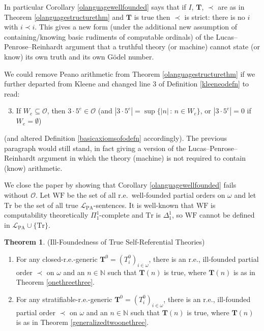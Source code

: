 \documentclass[reqno]{article}
\theoremstyle{definition}
\newtheorem{theorem}{Theorem}
\def\N{\mathbb{N}}
\def\L{\mathscr{L}}
\def\T{\mathbf{T}}
\def\O{\mathcal{O}}
\def\LPA{\L_{\mathrm{PA}}}
\def\Tr{\mathrm{Tr}}
\begin{document}
In particular
Corollary \ref{olanguagewellfounded} says that
if $I$, $\T$, $\prec$ are as in Theorem \ref{olanguagestructurethm} and $\T$ is true
then $\prec$ is strict: there is no $i$ with $i\prec i$.
This gives a new form
(under the additional new assumption of containing/knowing basic rudiments of computable ordinals)
of the Lucas--Penrose--Reinhardt argument that a truthful theory (or machine)
cannot state (or know) its own truth and its own G\"odel number.

We could remove Peano arithmetic from Theorem \ref{olanguagestructurethm}
if we further departed from Kleene and changed line 3 of Definition 
\ref{kleeneodefn} to read:
\begin{enumerate}
\setcounter{enumi}{2}
\item If $W_e\subseteq\O$, then $3\cdot 5^e\in\O$ (and 
$|3\cdot 5^e|=\sup\{|n|\,:\,n\in W_e\}$, or $|3\cdot 5^e|=0$
if $W_e=\emptyset$)
\end{enumerate}
(and altered Definition \ref{basicaxiomsofodefn} accordingly).
The previous paragraph would still stand, in fact giving a version
of the Lucas--Penrose--Reinhardt argument in which the theory (machine)
is not required to contain (know) arithmetic.


We close the paper by showing that Corollary \ref{olanguagewellfounded}
fails without $\O$.  Let $\mathrm{WF}$ be the set
of all r.e.~well-founded partial orders on $\omega$
and let $\Tr$ be the set of all
true $\LPA$-sentences.
It is well-known that $\mathrm{WF}$ is computability theoretically
$\Pi^1_1$-complete and $\Tr$ is $\Delta^1_1$, so
$\mathrm{WF}$ cannot be defined
in $\LPA\cup\{\Tr\}$.

\begin{theorem}
(Ill-Foundedness of True Self-Referential Theories)
\begin{enumerate}
\item
For any closed-r.e.-generic $\T^0=(T^0_i)_{i\in\omega}$,
there is an r.e., ill-founded partial order $\prec$ on $\omega$
and an $n\in\N$
such that $\T(n)$ is true,
where $\T(n)$ is as in Theorem \ref{onethreethree}.
\item
For any stratifiable-r.e.-generic $\T^0=(T^0_i)_{i\in\omega}$, there is an 
r.e., ill-founded partial order $\prec$ on $\omega$ and an $n\in\N$ such that
$\T(n)$ is true, where $\T(n)$ is as in Theorem \ref{generalizedtwoonethree}.
\end{enumerate}
\end{theorem}
\end{document}
